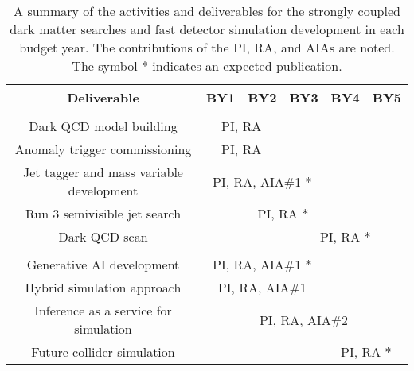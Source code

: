 \begin{table}[!hbtp]
\vspace{\myfigurespacing}
\begin{center}
\begin{tabular}{cccccc}
Deliverable & BY1 & BY2 & BY3 & BY4 & BY5 \\
\hline
\multicolumn{6}{c}{}\\[-\cmsTabSkip]
Dark QCD model building & \multicolumn{2}{c}{\cellcolor{blue!25} PI, RA} & & & \\
Anomaly trigger commissioning & \multicolumn{2}{c}{\cellcolor{blue!25} PI, RA} & & & \\
Jet tagger and mass variable development & \multicolumn{3}{c}{\cellcolor{blue!25} PI, RA, AIA\#1 $\ast$} & & \\
Run 3 semivisible jet search & & \multicolumn{2}{c}{\cellcolor{blue!50} PI, RA $\ast$} & & \\
Dark QCD scan & & & \multicolumn{3}{c}{\cellcolor{blue!75} PI, RA $\ast$} \\
\multicolumn{6}{c}{}\\[-\cmsTabSkip]
Generative AI development & \multicolumn{3}{c}{\cellcolor{orange!25} PI, RA, AIA\#1 $\ast$} & & \\
Hybrid simulation approach & \multicolumn{3}{c}{\cellcolor{orange!25} PI, RA, AIA\#1} & & \\
Inference as a service for simulation & & \multicolumn{3}{c}{\cellcolor{orange!50} PI, RA, AIA\#2} & \\
Future collider simulation & & & & \multicolumn{2}{c}{\cellcolor{orange!75} PI, RA $\ast$} \\
\end{tabular}
\vspace{\myfigureskip}
\caption{A summary of the activities and deliverables for the strongly coupled dark matter searches and fast detector simulation development in each budget year. The contributions of the PI, RA, and AIAs are noted. The symbol $\ast$ indicates an expected publication.}
\label{tab:activities}
\end{center}
\end{table}

\clearpage
